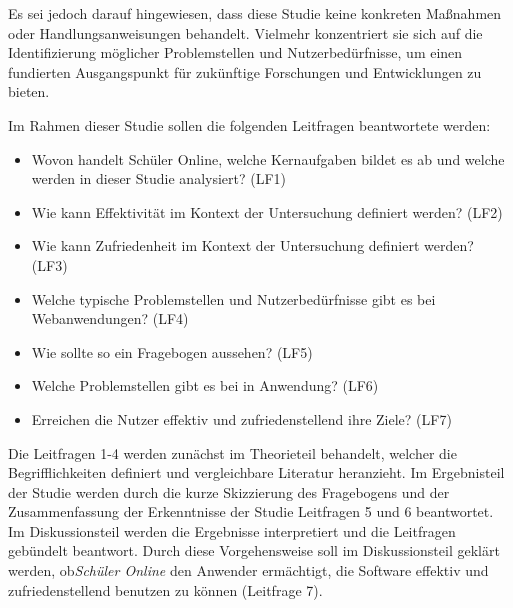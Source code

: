 Es sei jedoch darauf hingewiesen, dass diese Studie keine konkreten Maßnahmen oder Handlungsanweisungen behandelt. Vielmehr konzentriert sie sich auf die Identifizierung möglicher Problemstellen und Nutzerbedürfnisse, um einen fundierten Ausgangspunkt für zukünftige Forschungen und Entwicklungen zu bieten.

Im Rahmen dieser Studie sollen die folgenden Leitfragen beantwortete werden: 
\begin{itemize}
    \item Wovon handelt Schüler Online, welche Kernaufgaben bildet es ab und welche werden in dieser Studie analysiert? (LF1)%
    \item Wie kann Effektivität im Kontext der Untersuchung definiert werden? (LF2)%
    \item Wie kann Zufriedenheit im Kontext der Untersuchung definiert werden? (LF3)%
    \item Welche typische Problemstellen und Nutzerbedürfnisse gibt es bei Webanwendungen? (LF4)%
    \item Wie sollte so ein Fragebogen aussehen? (LF5)%
    \item Welche Problemstellen gibt es bei in Anwendung? (LF6)%
    \item Erreichen die Nutzer effektiv und zufriedenstellend ihre Ziele? (LF7)%
\end{itemize}

Die Leitfragen 1-4 werden zunächst im Theorieteil behandelt, welcher die Begrifflichkeiten definiert und vergleichbare Literatur heranzieht. Im Ergebnisteil der Studie werden durch die kurze Skizzierung des Fragebogens und der Zusammenfassung der Erkenntnisse der Studie Leitfragen 5 und 6 beantwortet. Im Diskussionsteil werden die Ergebnisse interpretiert und die Leitfragen gebündelt beantwort. Durch diese Vorgehensweise soll im Diskussionsteil geklärt werden, ob\textit{Schüler Online} den Anwender ermächtigt, die Software effektiv und zufriedenstellend benutzen zu können (Leitfrage 7).


